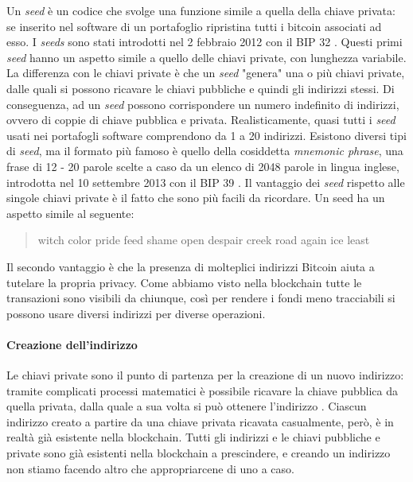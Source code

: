 \documentclass {article}
\begin{document}
Un \textit{seed} è un codice che svolge una funzione simile a quella della chiave privata: se inserito nel software di un portafoglio ripristina tutti i bitcoin associati ad esso.
I \textit{seeds} sono stati introdotti nel 2 febbraio 2012 con il BIP 32 \cite{bip32}.
Questi primi \textit{seed} hanno un aspetto simile a quello delle chiavi private, con lunghezza variabile.
La differenza con le chiavi private è che un \textit{seed} "genera" una o più chiavi private, dalle quali si possono ricavare le chiavi pubbliche e quindi gli indirizzi stessi.
Di conseguenza, ad un \textit{seed} possono corrispondere un numero indefinito di indirizzi, ovvero di coppie di chiave pubblica e privata.
Realisticamente, quasi tutti i \textit{seed} usati nei portafogli software comprendono da 1 a 20 indirizzi.
Esistono diversi tipi di \textit{seed}, ma il formato più famoso è quello della cosiddetta \textit{mnemonic phrase}, una frase di 12 - 20 parole scelte a caso da un elenco di 2048 parole in lingua inglese, introdotta nel 10 settembre 2013 con il BIP 39 \cite{bip39}.
Il vantaggio dei \textit{seed} rispetto alle singole chiavi private è il fatto che sono più facili da ricordare. Un seed ha un aspetto simile al seguente:

\begin{quote}

witch color pride feed shame open despair creek road again ice least

\end{quote}
%
Il secondo vantaggio è che la presenza di molteplici indirizzi Bitcoin aiuta a tutelare la propria privacy.
Come abbiamo visto nella blockchain tutte le transazioni sono visibili da chiunque, così per rendere i fondi meno tracciabili si possono usare diversi indirizzi per diverse operazioni.

\paragraph {Creazione dell'indirizzo}

Le chiavi private sono il punto di partenza per la creazione di un nuovo indirizzo: tramite complicati processi matematici è possibile ricavare la chiave pubblica da quella privata, dalla quale a sua volta si può ottenere l'indirizzo \cite{makingaddress}.
Ciascun indirizzo creato a partire da una chiave privata ricavata casualmente, però, è in realtà già esistente nella blockchain.
Tutti gli indirizzi e le chiavi pubbliche e private sono già esistenti nella blockchain a prescindere, e creando un indirizzo non stiamo facendo altro che appropriarcene di uno a caso.
\end{document}
